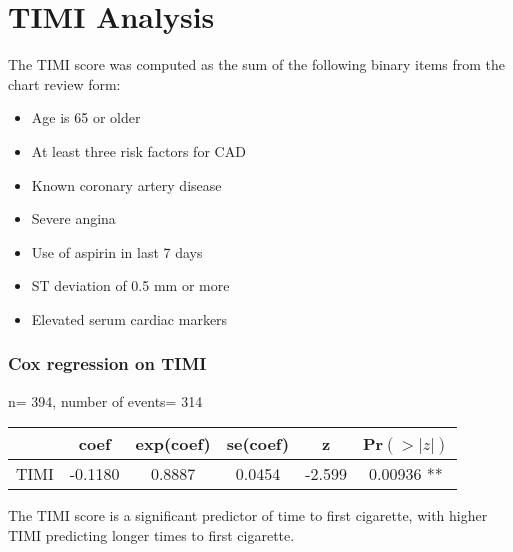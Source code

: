 \documentclass[12pt]{article}
\begin{document}
\section*{TIMI Analysis}

\par\vspace{0.3 cm}
The TIMI score was computed as the sum of the following binary items from the chart review form:
\begin{itemize}
\item Age is 65 or older
\item At least three risk factors for CAD
\item Known coronary artery disease
\item Severe angina
\item Use of aspirin in last 7 days
\item ST deviation of 0.5 mm or more
\item Elevated serum cardiac markers
\end{itemize}
\par\vspace{0.3 cm}
\subsubsection*{Cox regression on TIMI}

  n= 394, number of events= 314
\par\vspace{0.3 cm}
\begin{tabular}{cccccc}
    &     coef & exp(coef) &  se(coef) & z   & Pr$(>|z|)$\\
\hline  
TIMI& -0.1180&    0.8887&   0.0454& -2.599&  0.00936 **
\end{tabular}
\par\vspace{0.3 cm}
The TIMI score is a significant predictor of time to first cigarette, with higher TIMI predicting longer times to first cigarette.
\par\vspace{0.3 cm}
\end{document}
